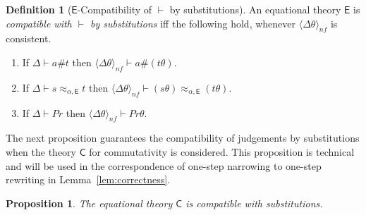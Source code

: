 \documentclass[submission,copyright,creativecommons]{eptcs}
\newcommand{\daniele}[1]{\textcolor{cyan}{#1}}
\newcommand{\caleq}{\approx_{\alpha,\theory{C}}}
\newcommand{\ealeq}{\approx_{\alpha,\theory{E}}}
\newcommand{\pair}[1]{\langle #1\rangle}
\newcommand{\theory}[1]{\ensuremath{\mathsf{#1}}}
\theoremstyle{plain}
\newtheorem{proposition}[theorem]{Proposition}
\theoremstyle{definition}
\newtheorem{definition}[theorem]{Definition}
\theoremstyle{remark}
\begin{document}
 
\begin{definition}[\theory{E}-Compatibility of $\vdash$ by substitutions]\label{def:e-compatible}
    An equational theory \theory{E} is {\em compatible with $\vdash$ by substitutions} iff the following hold, whenever $\pair{\Delta\theta}_{nf}$ is consistent. 

    \begin{enumerate}
    \item If $\Delta \vdash a\# t$ then $\pair{\Delta\theta}_{nf} \vdash a\# (t\theta)$. 
    \item If $\Delta \vdash s \ealeq t$ then $\pair{\Delta\theta}_{nf} \vdash (s\theta) \ealeq (t\theta) $.
    \item If $\Delta \vdash Pr$ then $\pair{\Delta\theta}_{nf} \vdash Pr\theta$.
\end{enumerate}
\end{definition}


The next proposition guarantees the compatibility of judgements by substitutions when the theory \theory{C} for commutativity is considered. This proposition is technical and will be used in the correspondence of one-step narrowing to one-step rewriting in Lemma~\ref{lem:correctness}.




\begin{proposition}
\label{lem:nf-subst}
The equational theory \theory{C} is compatible with substitutions.
\end{proposition}
\end{document}
